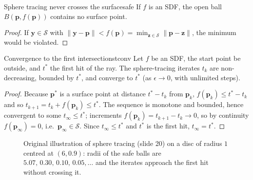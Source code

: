 \documentclass[11pt,a4paper]{article}
\newcommand{\bp}{{\bm{p}}}
\begin{document}
\begin{Lemma}{Sphere tracing never crosses the surface}{safe}
If $f$ is an SDF, the open ball $B(\bp,f(\bp))$ contains no surface point.
\end{Lemma}
\begin{proof}
If $\bm y\in\mathcal S$ with $\|\bm y-\bp\|<f(\bp)=\min_{\bm z\in\mathcal S}\|\bp-\bm z\|$, the minimum would be violated.
\end{proof}

\begin{Proposition}{Convergence to the first intersection}{stconv}
Let $f$ be an SDF, the start point be outside, and $t^*$ the first hit of the ray. The sphere-tracing iterates $t_k$
are non-decreasing, bounded by $t^*$, and converge to $t^*$ (as $\epsilon\to 0$, with unlimited steps).
\end{Proposition}
\begin{proof}
Because $\bp^*$ is a surface point at distance $t^*-t_k$ from $\bp_k$, $f(\bp_k)\le t^*-t_k$ and so
$t_{k+1}=t_k+f(\bp_k)\le t^*$. The sequence is monotone and bounded, hence convergent to some $t_\infty\le t^*$;
increments $f(\bp_k)=t_{k+1}-t_k\to 0$, so by continuity $f(\bp_\infty)=0$, i.e.\ $\bp_\infty\in\mathcal S$.
Since $t_\infty\le t^*$ and $t^*$ is the first hit, $t_\infty=t^*$.
\end{proof}

\begin{figure}[htbp]
\centering
{}
\caption{Original illustration of sphere tracing (slide 20) on a disc of radius $1$ centred at $(6,0.9)$: radii of the
safe balls are $5.07,\,0.30,\,0.10,\,0.05,\dots$ and the iterates approach the first hit without crossing it.}
\end{figure}
\end{document}

